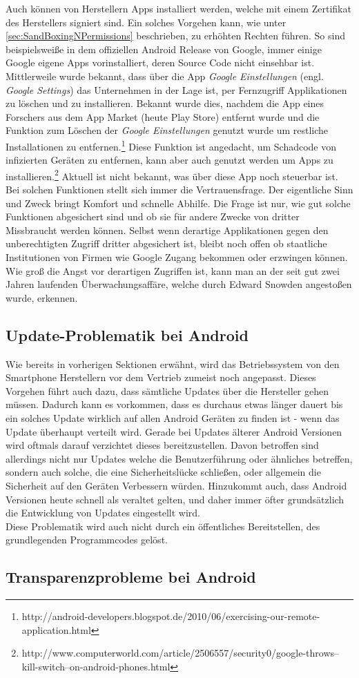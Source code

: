 Auch können von Herstellern Apps installiert werden, welche mit einem Zertifikat des Herstellers signiert sind. Ein solches Vorgehen kann, wie unter \ref*{sec:SandBoxingNPermissions} beschrieben, zu erhöhten Rechten führen.
So sind beispielsweiße in dem offiziellen Android Release von Google, immer einige Google eigene Apps vorinstalliert, deren Source Code nicht einsehbar ist. Mittlerweile wurde bekannt, dass über die App \textit{Google Einstellungen} (engl. \textit{Google Settings}) das Unternehmen in der Lage ist, per Fernzugriff Applikationen zu löschen und zu installieren. Bekannt wurde dies, nachdem die App eines Forschers aus dem App Market (heute Play Store) entfernt wurde und die Funktion zum Löschen der \textit{Google Einstellungen} genutzt wurde um restliche Installationen zu entfernen.\footnote{http://android-developers.blogspot.de/2010/06/exercising-our-remote-application.html} 
Diese Funktion ist angedacht, um Schadcode von infizierten Geräten zu entfernen, kann aber auch genutzt werden um Apps zu installieren.\footnote{http://www.computerworld.com/article/2506557/security0/google-throws--kill-switch--on-android-phones.html} Aktuell ist nicht bekannt, was über diese App noch steuerbar ist.\\
Bei solchen Funktionen stellt sich immer die Vertrauensfrage. Der eigentliche Sinn und Zweck bringt Komfort und schnelle Abhilfe. Die Frage ist nur, wie gut solche Funktionen abgesichert sind und ob sie für andere Zwecke von dritter Missbraucht werden können. Selbst wenn derartige Applikationen gegen den unberechtigten Zugriff dritter abgesichert ist, bleibt noch offen ob staatliche Institutionen von Firmen wie Google Zugang bekommen oder erzwingen können. Wie groß die Angst vor derartigen Zugriffen ist, kann man an der seit gut zwei Jahren laufenden Überwachungsaffäre, welche durch Edward Snowden angestoßen wurde, erkennen.

\subsection{Update-Problematik bei Android}
Wie bereits in vorherigen Sektionen erwähnt, wird das Betriebssystem von den Smartphone Herstellern vor dem Vertrieb zumeist noch angepasst. Dieses Vorgehen führt auch dazu, dass sämtliche Updates über die Hersteller gehen müssen. Dadurch kann es vorkommen, dass es durchaus etwas länger dauert bis ein solches Update wirklich auf allen Android Geräten zu finden ist - wenn das Update überhaupt verteilt wird. Gerade bei Updates älterer Android Versionen wird oftmals darauf verzichtet dieses bereitzustellen. Davon betroffen sind allerdings nicht nur Updates welche die Benutzerführung oder ähnliches betreffen, sondern auch solche, die eine Sicherheitslücke schließen, oder allgemein die Sicherheit auf den Geräten Verbessern würden. Hinzukommt auch, dass Android Versionen heute schnell als veraltet gelten, und daher immer öfter grundsätzlich die Entwicklung von Updates eingestellt wird.\\
Diese Problematik wird auch nicht durch ein öffentliches Bereitstellen, des grundlegenden Programmcodes gelöst.

\subsection{Transparenzprobleme bei Android}